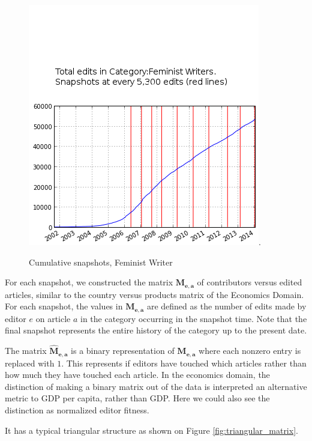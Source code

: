 \documentclass{acm_proc_article-sp}
\begin{document}
\begin{figure}[!t]
\centering
\includegraphics[width=0.9\columnwidth]{accumulative snapshot points for Feminist Writers.png}.
\caption{Cumulative snapshots, Feminist Writer}
\label{fig:cumsnaps}
\end{figure}

 For each snapshot, we constructed the matrix $\mathbf{M_{e,a}}$ of contributors versus edited articles, similar to the country versus products matrix of the Economics Domain. For each snapshot, the values in $\mathbf{M_{e,a}}$ are defined as the number of edits made by editor $e$ on article $a$ in the category occurring in the snapshot time. Note that the final snapshot represents the entire history of the category up to the present date.


 

The matrix $\mathbf{\hat{M}_{e,a}}$ is a binary representation of $\mathbf{M_{e,a}}$ where each nonzero entry is replaced with $1$. This represents if editors have touched which articles rather than how much they have touched each article. In the economics domain, the distinction of making a binary matrix out of the data is interpreted an alternative metric to GDP per capita, rather than GDP. Here we could also see the distinction as normalized editor fitness.

It has a typical triangular structure as shown on Figure \ref{fig:triangular_matrix}.
\end{document}
